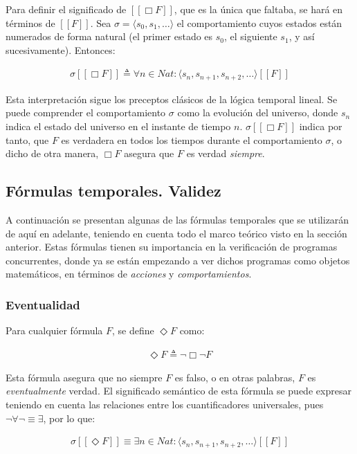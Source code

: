 Para definir el significado de $[[\Box F]]$, que es la única que faltaba, se hará en términos de $[[F]]$. Sea $\sigma = \langle s_0, s_1, \ldots \rangle$ el comportamiento cuyos estados están numerados de forma natural (el primer estado es $s_0$, el siguiente $s_1$, y así sucesivamente). Entonces:

\begin{align}
\sigma[[\Box F]] \triangleq \forall n \in Nat : \langle s_n, s_{n+1}, s_{n+2}, \ldots \rangle[[F]]
\end{align}

Esta interpretación sigue los preceptos clásicos de la lógica temporal lineal. Se puede comprender el comportamiento $\sigma$ como la evolución del universo, donde $s_n$ indica el estado del universo en el instante de tiempo $n$. $\sigma[[\Box F]]$ indica por tanto, que $F$ es verdadera en todos los tiempos durante el comportamiento $\sigma$, o dicho de otra manera, $\Box F$ asegura que $F$ es verdad \textit{siempre}.

\subsection{Fórmulas temporales. Validez}\label{subsection:LTForms}
A continuación se presentan algunas de las fórmulas temporales que se utilizarán de aquí en adelante, teniendo en cuenta todo el marco teórico visto en la sección anterior. Estas fórmulas tienen su importancia en la verificación de programas concurrentes, donde ya se están empezando a ver dichos programas como objetos matemáticos, en términos de \textit{acciones} y \textit{comportamientos}.

\subsubsection{Eventualidad}\label{subsubsection:LTFormsEventually}
\noindent
Para cualquier fórmula $F$, se define $\Diamond F$ como:

\begin{align}
\Diamond F \triangleq \neg \Box \neg F
\end{align}

Esta fórmula asegura que no siempre $F$ es falso, o en otras palabras, $F$ es \textit{eventualmente} verdad. El significado semántico de esta fórmula se puede expresar teniendo en cuenta las relaciones entre los cuantificadores universales, pues $\neg\forall\neg \equiv \exists$, por lo que:

\begin{align}
\sigma[[\Diamond F]] \equiv \exists n \in Nat : \langle s_n, s_{n+1}, s_{n+2}, \ldots \rangle[[F]]
\end{align}

